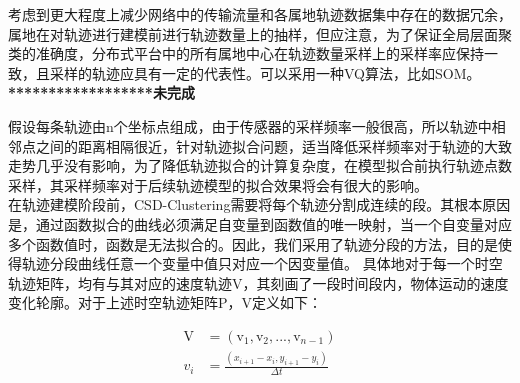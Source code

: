 考虑到更大程度上减少网络中的传输流量和各属地轨迹数据集中存在的数据冗余，属地在对轨迹进行建模前进行轨迹数量上的抽样，但应注意，为了保证全局层面聚类的准确度，分布式平台中的所有属地中心在轨迹数量采样上的采样率应保持一致，且采样的轨迹应具有一定的代表性。可以采用一种VQ算法，比如SOM。\\
\textbf{******************未完成}

假设每条轨迹由n个坐标点组成，由于传感器的采样频率一般很高，所以轨迹中相邻点之间的距离相隔很近，针对轨迹拟合问题，适当降低采样频率对于轨迹的大致走势几乎没有影响，为了降低轨迹拟合的计算复杂度，在模型拟合前执行轨迹点数采样，其采样频率对于后续轨迹模型的拟合效果将会有很大的影响。\\
在轨迹建模阶段前，CSD-Clustering需要将每个轨迹分割成连续的段。其根本原因是，通过函数拟合的曲线必须满足自变量到函数值的唯一映射，当一个自变量对应多个函数值时，函数是无法拟合的。因此，我们采用了轨迹分段的方法，目的是使得轨迹分段曲线任意一个变量中值只对应一个因变量值。
具体地对于每一个时空轨迹矩阵，均有与其对应的速度轨迹V，其刻画了一段时间段内，物体运动的速度变化轮廓。对于上述时空轨迹矩阵P，V定义如下：

\[\begin{aligned}
	\text{V}&=\left( \text{v}_1,\text{v}_2,...,\text{v}_{n-1} \right)\\
	v_i&=\frac{\left( x_{i+1}-x_i,y_{i+1}-y_i \right)}{\varDelta t}\\
\end{aligned}\]

